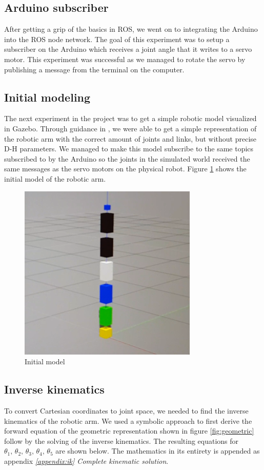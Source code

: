 \documentclass[11pt,a4paper, titlepage]{article}
\begin{document}
	\subsection{Arduino subscriber}
	After getting a grip of the basics in ROS, we went on to integrating the Arduino into the ROS node network. The goal of this experiment was to setup a subscriber on the Arduino which receives a joint angle that it writes to a servo motor. This experiment was successful as we managed to rotate the servo by publishing a message from the terminal on the computer.
	
	\subsection{Initial modeling}
	The next experiment in the project was to get a simple robotic model visualized in Gazebo. Through guidance in \cite{joseph2015}, we were able to get a simple representation of the robotic arm with the correct amount of joints and links, but without precise D-H parameters. We managed to make this model subscribe to the same topics subscribed to by the Arduino so the joints in the simulated world received the same messages as the servo motors on the physical robot. Figure \ref{fig:init-model} shows the initial model of the robotic arm.
	
	\begin{figure}[H]
		\centering
		\includegraphics[width=0.5\linewidth]{../Diagrams/URDF-first.png}
		\caption{Initial model}
		\label{fig:init-model}
	\end{figure}
	
	\subsection{Inverse kinematics}
	\label{invkin}
	To convert Cartesian coordinates to joint space, we needed to find the inverse kinematics of the robotic arm. We used a symbolic approach to first derive the forward equation of the geometric representation shown in figure \ref{fig:geometric} follow by the solving of the inverse kinematics. The resulting equations for $\theta_1,\,\theta_2,\,\theta_3,\,\theta_4,\,\theta_5$ are shown below. The mathematics in its entirety is appended as appendix \textit{\ref{appendix:ik} Complete kinematic solution}.
	
\end{document}
